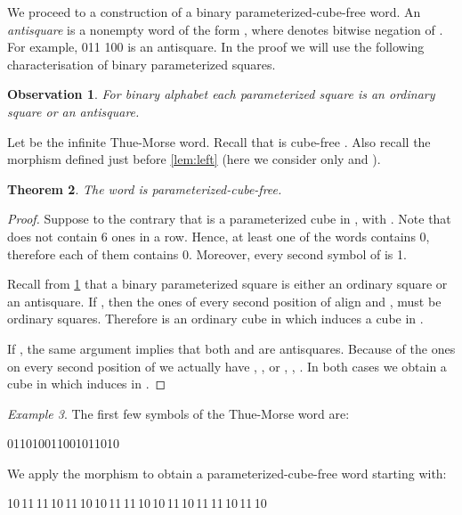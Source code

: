\documentclass{article}
\theoremstyle{plain}
\newtheorem{theorem}{Theorem}[section]
\newtheorem{observation}[theorem]{Observation}
\theoremstyle{definition}
\theoremstyle{remark}
\newtheorem{example}[theorem]{Example}
\begin{document}
  We proceed to a construction of a binary parameterized-cube-free word.
  An \emph{antisquare} is a nonempty word of the form , where  denotes bitwise negation of .
  For example, 011 100 is an antisquare.
  In the proof we will use the following characterisation of binary parameterized squares.
  
  \begin{observation}\label{obs:anti}
    For binary alphabet each parameterized square is an ordinary square or an antisquare.
  \end{observation}

  Let  be the infinite Thue-Morse word.
  Recall that  is cube-free \cite{Thue2}.
  Also recall the morphism  defined just before \cref{lem:left}
  (here we consider only  and ).

  \begin{theorem}
    The word  is parameterized-cube-free.
  \end{theorem}
  \begin{proof}
    Suppose to the contrary that  is a parameterized cube in , with
    .
    Note that  does not contain 6 ones in a row.
    Hence, at least one of the words  contains 0, therefore each of them contains 0.
    Moreover, every second symbol of  is 1.

    Recall from \cref{obs:anti} that a binary parameterized square is either
    an ordinary square or an antisquare.
    If , then the ones of every second position of  align
    and ,  must be ordinary squares.
    Therefore  is an ordinary cube in  which induces a cube in .

    If , the same argument implies that both  and  are antisquares.
    Because of the ones on every second position of 
    we actually have , ,  or
    , , .
    In both cases we obtain a cube  in  which induces   in .
  \end{proof}

  \begin{example}
    The first few symbols of the Thue-Morse word  are:
    \begin{center}
      011010011001011010\,
    \end{center}
    We apply the morphism  to obtain a parameterized-cube-free word
    starting with:
    \begin{center}
      10\,11\,11\,10\,11\,10\,10\,11\,11\,10\,10\,11\,10\,11\,11\,10\,11\,10\,
    \end{center}
  \end{example}
\end{document}
